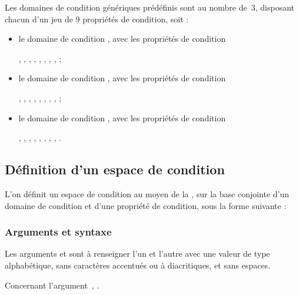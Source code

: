 \documentclass{article}
\begin{document}
Les domaines de condition génériques prédéfinis sont au nombre de~3, disposant chacun d'un jeu de 9 propriétés de condition, soit :

\begin{itemize}
    \item le domaine de condition , avec les propriétés de condition
        \begin{valenum}
            { ,  , , , , , , ,  ;}
        \end{valenum}
    \item le domaine de condition , avec les propriétés de condition
        \begin{valenum}
            { ,  , , , , , , ,  ;}
        \end{valenum}
    \item le domaine de condition , avec les propriétés de condition
        \begin{valenum}
            { ,  , , , , , , , .}
        \end{valenum}
\end{itemize}

\subsection{Définition d'un espace de condition}\label{CtDoc_Commandes_SetCondiSpace}
L'on définit un espace de condition au moyen de la , sur la base conjointe d'un domaine de condition et d'une propriété de condition, sous la forme suivante :


\subsubsection{Arguments et syntaxe}
Les arguments  et  sont à renseigner l'un et l'autre avec une valeur de type alphabétique, sans caractères accentués ou à diacritiques, et sans espaces.

Concernant l'argument~\val{*}, .
\end{document}
